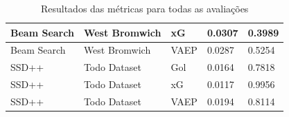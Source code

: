 \documentclass{beamer}
\begin{document}
\begin{frame}
\begin{table}[H]
\begin{tabular}{|l|l|l|l|l|}
            \hline
            Beam Search & West Bromwich & xG & 0.0307 & 0.3989 
            \\
            \hline
            Beam Search & West Bromwich & VAEP & 0.0287 & 0.5254 
            \\
            \hline
            SSD++ & Todo Dataset & Gol & 0.0164 & 0.7818 
            \\
            \hline
            SSD++ & Todo Dataset & xG & 0.0117 & 0.9956
            \\
            \hline
            SSD++ & Todo Dataset & VAEP & 0.0194 & 0.8114
            \\
            \hline
        \end{tabular}
        \caption{Resultados das métricas para todas as avaliações}
        \label{tab:resultMetricas}
    \end{table}
\end{frame}
\end{document}
